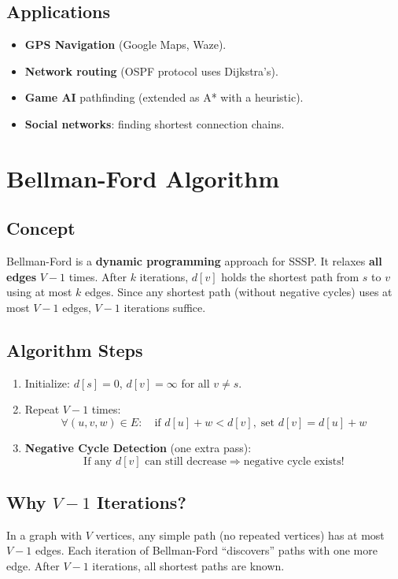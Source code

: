 \documentclass[12pt,a4paper]{article}
\begin{document}
\subsection{Applications}
\begin{itemize}
    \item \textbf{GPS Navigation} (Google Maps, Waze).
    \item \textbf{Network routing} (OSPF protocol uses Dijkstra's).
    \item \textbf{Game AI} pathfinding (extended as A* with a heuristic).
    \item \textbf{Social networks}: finding shortest connection chains.
\end{itemize}

\newpage

\section{Bellman-Ford Algorithm}

\subsection{Concept}
Bellman-Ford is a \textbf{dynamic programming} approach for SSSP. It relaxes \textbf{all edges} $V-1$ times. After $k$ iterations, $d[v]$ holds the shortest path from $s$ to $v$ using at most $k$ edges. Since any shortest path (without negative cycles) uses at most $V-1$ edges, $V-1$ iterations suffice.

\subsection{Algorithm Steps}
\begin{enumerate}
    \item Initialize: $d[s] = 0$, $d[v] = \infty$ for all $v \ne s$.
    \item Repeat $V - 1$ times:
    \[
    \forall (u,v,w) \in E:\quad \text{if } d[u] + w < d[v],\;\text{set } d[v] = d[u] + w
    \]
    \item \textbf{Negative Cycle Detection} (one extra pass):
    \[
    \text{If any } d[v] \text{ can still decrease} \Rightarrow \text{negative cycle exists!}
    \]
\end{enumerate}

\subsection{Why $V - 1$ Iterations?}
In a graph with $V$ vertices, any simple path (no repeated vertices) has at most $V - 1$ edges. Each iteration of Bellman-Ford ``discovers'' paths with one more edge. After $V-1$ iterations, all shortest paths are known.
\end{document}
